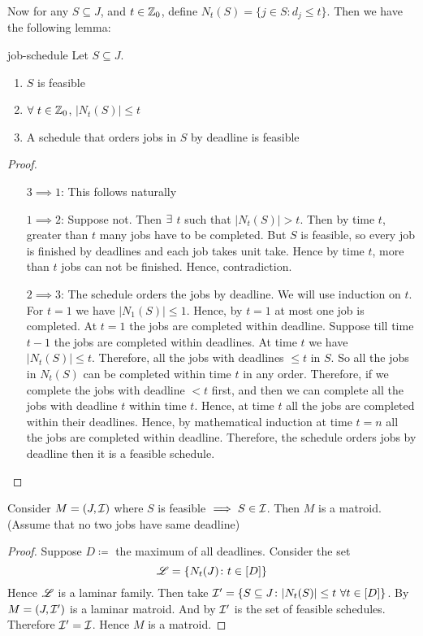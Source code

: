 Now  for any $S\subseteq J$, and $t\in\mathbb{Z}_0$, define $N_t(S)=\{j\in S\colon d_j\leq t\}$. Then we have the following lemma:
\begin{lemma}{}{job-schedule}
	Let $S\subseteq J$. \Tfae
	\begin{enumerate}[label=\bfseries\tiny\protect\circled{\small\arabic*}]
		\item $S$ is feasible
		\item $\forall\ t\in\mathbb{Z}_0$, $|N_t(S)|\leq t$
		\item A schedule that orders jobs in $S$ by deadline is feasible
	\end{enumerate}
\end{lemma}
\begin{proof}

\begin{itemize}[wide]
	\item[$3\implies 1$:] This follows naturally
	\item[$1\implies 2$:] Suppose not. Then $\exists$ $t$ such that $|N_t(S)|>t$. Then by time $t$, greater than $t$ many jobs have to be completed. But  $S$ is feasible, so every job is finished by deadlines and each job takes unit take. Hence by time $t$, more than $t$ jobs can not be finished. Hence, contradiction.
	\item[$2\implies 3$:] The schedule orders the jobs by deadline. We will use induction on $t$. For $t=1$ we have $|N_1(S)|\leq 1$. Hence, by $t=1$ at most one job is completed. At $t=1$ the jobs are completed within deadline. Suppose till time $t-1$ the jobs are completed within deadlines. At time $t$ we have $|N_t(S)|\leq t$. Therefore, all the jobs with deadlines $\leq t$ in $S$. So all the jobs in $N_t(S)$ can be completed within time $t$ in any order. Therefore, if we complete the jobs with deadline $<t$ first, and then we can complete all the jobs with deadline $t$ within time $t$. Hence, at time $t$ all the jobs are completed within their deadlines. Hence, by mathematical induction at time $t=n$ all the jobs are completed within deadline. Therefore, the schedule orders jobs by deadline then it is a feasible schedule.
\end{itemize}
\end{proof}
\begin{lemma}{}{}
	Consider $M=(J,\mathcal{I})$ where $S$ is feasible $\implies S\in \mathcal{I}$. Then $M$ is a matroid. (Assume that no two jobs have same deadline)
\end{lemma}
\begin{proof}
	Suppose $D\coloneqq $ the maximum of all deadlines. Consider the set $${\mathscr{L}}=\{N_t(J)\colon t\in [D]\}$$Hence ${\mathscr{L}}$ is a laminar family. Then take $\mathcal{I}'=\{S\subseteq J\colon |N_t(S)|\leq t\ \forall t\in [D]\}$. By  $M=(J,\mathcal{I}')$ is a laminar matroid. And by  $\mathcal{I}'$ is the set of feasible schedules. Therefore $\mathcal{I}'=\mathcal{I}$. Hence $M$ is a matroid.
\end{proof}

